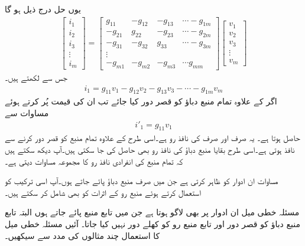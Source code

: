 یوں حل درج ذیل ہو گا
\begin{align*}
\begin{bmatrix}
i_1\\
i_2\\
i_3\\
\vdots\\
i_m
\end{bmatrix}
=
\begin{bmatrix}
g_{11} & -g_{12}& -g_{13}& \cdots -g_{1m}\\
-g_{21} & g_{22}& -g_{23}& \cdots -g_{2m}\\
-g_{31} & -g_{32}& g_{33}& \cdots -g_{3m}\\
\vdots\\
-g_{m1}&-g_{m2}&-g_{m3}&\cdots g_{mm}
\end{bmatrix}
\begin{bmatrix}
v_{1}\\
v_{2}\\
v_{3}\\
\vdots\\
v_{m}
\end{bmatrix}
\end{align*}
جس سے  لکھتے ہیں۔
\begin{align}\label{مساوات_مسئلہ_عمومی_رو_حل}
i_1=g_{11} v_1-g_{12}v_2-g_{13}v_3 -\cdots -g_{1m}v_m
\end{align}
اگر  کے علاوہ تمام منبع دباؤ کو قصر دور کیا جائے تب ان کی قیمت  پُر کرتے ہوئے مساوات  سے 
\begin{align*}
i'_1=g_{11} v_1
\end{align*}
حاصل ہوتا ہے۔ یہ صرف اور صرف  کی نافذ رو ہے۔اسی طرح  کے علاوہ تمام منبع کو قصر دور کرنے سے   نافذ ہوتی ہے۔اسی طرح بقایا منبع دباؤ کی نافذ  رو بھی حاصل کی جا سکتی ہیں۔آپ دیکھ سکتے ہیں کہ تمام  منبع کی انفرادی نافذ رو کا مجموعہ مساوات  دیتی ہے۔

مساوات  ان ادوار کو ظاہر کرتی ہے جن میں صرف منبع دباؤ پائے جاتے ہوں۔آپ اسی ترکیب کو استعمال کرتے ہوئے منبع رو کے اثرات کو بھی شامل کر سکتے ہیں۔

مسئلہ خطی میل  ان ادوار پر بھی لاگو ہوتا  ہے جن میں تابع منبع  پائے جاتے ہوں البتہ تابع منبع دباؤ کو قصر دور اور تابع منبع رو کو کھلے دور نہیں کیا جاتا۔ آئیں مسئلہ خطی میل کا استعمال چند مثالوں کی مدد سے سیکھیں۔

